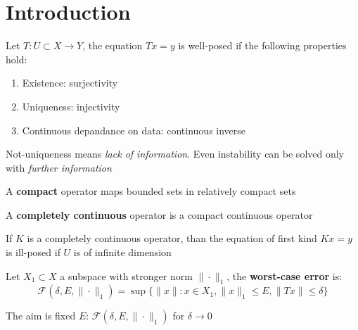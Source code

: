\section{Introduction}
\begin{definition}
 Let $T:U\subset X\to Y$, the equation $Tx=y$ is well-posed if the following properties hold:
 \begin{enumerate}
  \item Existence: surjectivity
  \item Uniqueness: injectivity
  \item Continuous depandance on data: continuous inverse
 \end{enumerate}
\end{definition}
Not-uniqueness means \textit{lack of information}. Even instability can be solved only with \textit{further information} 
\begin{definition}
 A \textbf{compact} operator maps bounded sets in relatively compact sets
\end{definition}
\begin{definition}
 A \textbf{completely continuous} operator is a compact continuous operator
\end{definition}
\begin{remark}
 If $K$ is a completely continuous operator, than the equation of first kind $Kx=y$ is ill-posed 
 if $U$ is of infinite dimension
\end{remark}
\begin{definition}
 Let $X_1\subset X$ a subspace with stronger norm $\|\cdot\|_1$, the \textbf{worst-case error} is:
  \[\mathcal{F}(\delta,E,\|\cdot\|_1)=\sup \{\|x\| : x\in X_1, \|x\|_1 \leq E, \| Tx\|\leq \delta\}\]
\end{definition}
The aim is fixed $E$: $\mathcal{F}(\delta, E, \| \cdot \|_1)$ for $\delta \to 0$


